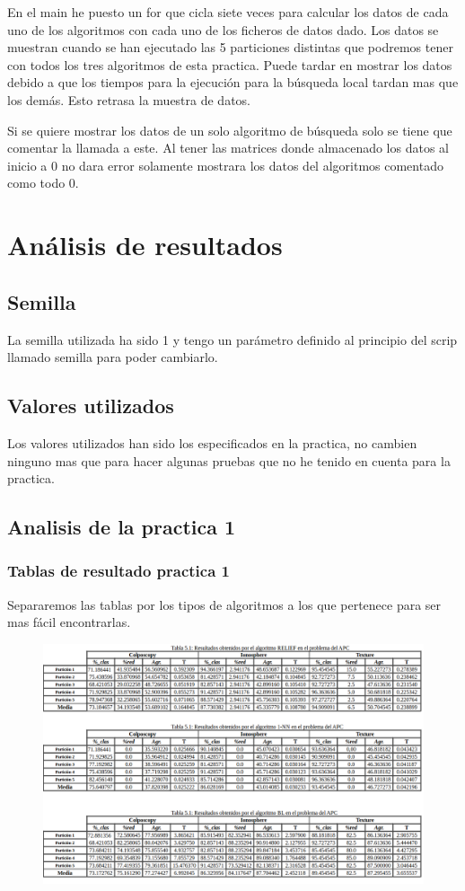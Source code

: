 \documentclass[titlepage]{article}
\begin{document}
	En el main he puesto un for que cicla siete veces para calcular los datos de cada uno de los algoritmos con cada uno de los ficheros de datos dado. Los datos se muestran cuando se han ejecutado las 5 particiones distintas que podremos tener con todos los tres algoritmos de esta practica. Puede tardar en mostrar los datos debido a que los tiempos para la ejecución para la búsqueda local tardan mas que los demás. Esto retrasa la muestra de datos.
	
	Si se quiere mostrar los datos de un solo algoritmo de búsqueda solo se tiene que comentar la llamada a este. Al tener las matrices donde almacenado los datos al inicio a 0 no dara error solamente mostrara los datos del algoritmos comentado como todo 0.
	\section{Análisis de resultados}
	\subsection{Semilla}
	La semilla utilizada ha sido 1 y tengo un parámetro definido al principio del scrip llamado semilla para poder cambiarlo.
	
	\subsection{Valores utilizados}	
	Los valores utilizados han sido los especificados en la practica, no cambien ninguno mas que para hacer algunas pruebas que no he tenido en cuenta para la practica. 
	\newpage
	\subsection{Analisis de la practica 1}
	\subsubsection{Tablas de resultado practica 1}
	
	Separaremos las tablas por los tipos de algoritmos a los que pertenece para ser mas fácil encontrarlas.
	\begin{figure}[H]
		\centering
		\includegraphics[width=1\linewidth]{screenshot004}
		\caption{}
		\label{fig:screenshot004}
	\end{figure}
	
\end{document}
